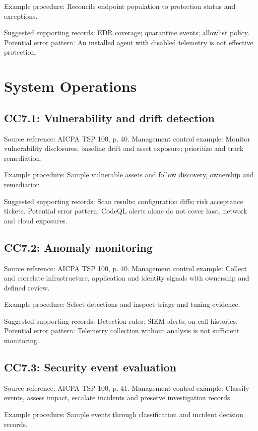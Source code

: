 \documentclass[10pt,oneside]{report}
\begin{document}
Example procedure: Reconcile endpoint population to protection status and exceptions.

Suggested supporting records: EDR coverage; quarantine events; allowlist policy. Potential error pattern: An installed agent with disabled telemetry is not effective protection.

\section{System Operations}
\subsection*{CC7.1: Vulnerability and drift detection}
Source reference: AICPA TSP 100, p. 40. Management control example: Monitor vulnerability disclosures, baseline drift and asset exposure; prioritize and track remediation.

Example procedure: Sample vulnerable assets and follow discovery, ownership and remediation.

Suggested supporting records: Scan results; configuration diffs; risk acceptance tickets. Potential error pattern: CodeQL alerts alone do not cover host, network and cloud exposures.

\subsection*{CC7.2: Anomaly monitoring}
Source reference: AICPA TSP 100, p. 40. Management control example: Collect and correlate infrastructure, application and identity signals with ownership and defined review.

Example procedure: Select detections and inspect triage and tuning evidence.

Suggested supporting records: Detection rules; SIEM alerts; on-call histories. Potential error pattern: Telemetry collection without analysis is not sufficient monitoring.

\subsection*{CC7.3: Security event evaluation}
Source reference: AICPA TSP 100, p. 41. Management control example: Classify events, assess impact, escalate incidents and preserve investigation records.

Example procedure: Sample events through classification and incident decision records.
\end{document}
